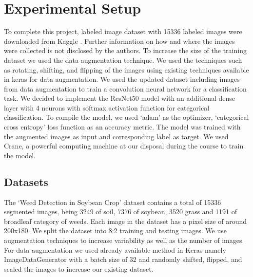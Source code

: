 \documentclass{report}
\begin{document}
\section{Experimental Setup}
To complete this project, labeled image dataset with 15336 labeled images were downloaded from Kaggle \cite{kaggle}. Further information on how and where the images were collected is not disclosed by the authors. To increase the size of the training dataset we used the data augmentation technique. We used the techniques such as rotating, shifting, and flipping of the images using existing techniques available in keras for data augmentation. We used the updated dataset including images from data augmentation to train a convolution neural network for a classification task. We decided to implement the ResNet50 model with an additional dense layer with 4 neurons with softmax activation function for categorical classification. To compile the model, we used ‘adam’ as the optimizer, ‘categorical cross entropy’ loss function as an accuracy metric. The model was trained with the augmented images as input and corresponding label as target. We used Crane, a powerful computing machine at our disposal during the course to train the model.

\subsection{Datasets}
The ‘Weed Detection in Soybean Crop’ dataset contains a total of 15336 segmented images, being 3249 of soil, 7376 of soybean, 3520 grass and 1191 of broadleaf category of weeds. Each image in the dataset has a pixel size of around 200x180. We split the dataset into 8:2 training and testing images. We use augmentation techniques to increase variability as well as the number of images. For data augmentation we used already available method in Keras namely ImageDataGenerator with a batch size of 32 and randomly shifted, flipped, and scaled the images to increase our existing dataset.
\end{document}
